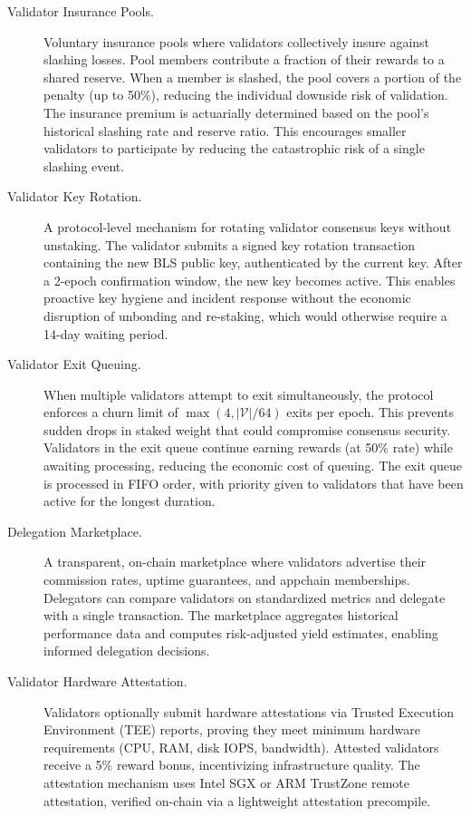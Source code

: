\documentclass[11pt,a4paper]{article}
\begin{document}
\begin{description}
    \item[Validator Insurance Pools.] Voluntary insurance pools where validators collectively insure against slashing losses. Pool members contribute a fraction of their rewards to a shared reserve. When a member is slashed, the pool covers a portion of the penalty (up to 50\%), reducing the individual downside risk of validation. The insurance premium is actuarially determined based on the pool's historical slashing rate and reserve ratio. This encourages smaller validators to participate by reducing the catastrophic risk of a single slashing event.

    \item[Validator Key Rotation.] A protocol-level mechanism for rotating validator consensus keys without unstaking. The validator submits a signed key rotation transaction containing the new BLS public key, authenticated by the current key. After a 2-epoch confirmation window, the new key becomes active. This enables proactive key hygiene and incident response without the economic disruption of unbonding and re-staking, which would otherwise require a 14-day waiting period.

    \item[Validator Exit Queuing.] When multiple validators attempt to exit simultaneously, the protocol enforces a churn limit of $\max(4, |\mathcal{V}| / 64)$ exits per epoch. This prevents sudden drops in staked weight that could compromise consensus security. Validators in the exit queue continue earning rewards (at 50\% rate) while awaiting processing, reducing the economic cost of queuing. The exit queue is processed in FIFO order, with priority given to validators that have been active for the longest duration.

    \item[Delegation Marketplace.] A transparent, on-chain marketplace where validators advertise their commission rates, uptime guarantees, and appchain memberships. Delegators can compare validators on standardized metrics and delegate with a single transaction. The marketplace aggregates historical performance data and computes risk-adjusted yield estimates, enabling informed delegation decisions.

    \item[Validator Hardware Attestation.] Validators optionally submit hardware attestations via Trusted Execution Environment (TEE) reports, proving they meet minimum hardware requirements (CPU, RAM, disk IOPS, bandwidth). Attested validators receive a 5\% reward bonus, incentivizing infrastructure quality. The attestation mechanism uses Intel SGX or ARM TrustZone remote attestation, verified on-chain via a lightweight attestation precompile.
\end{description}
\end{document}
